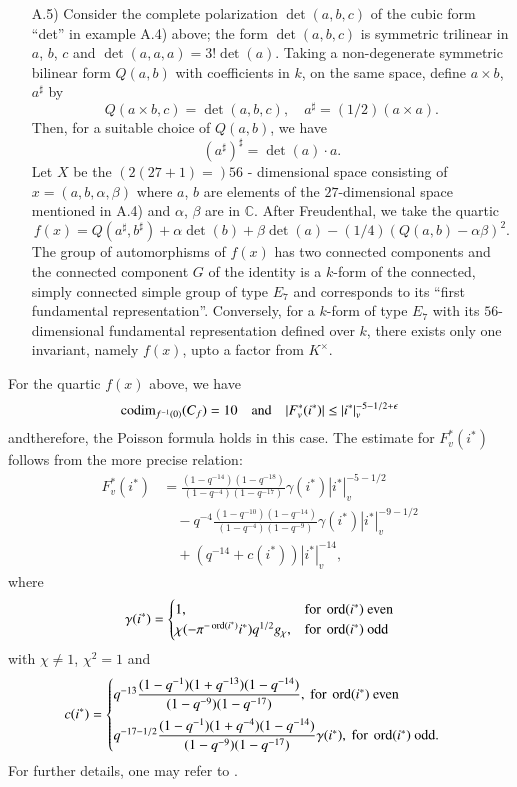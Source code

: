 \begin{itemize}
\item[A.5)] Consider the complete polarization $\det(a,b,c)$ of the
  cubic form ``det'' in example A.4) above; the form $\det(a,b,c)$ is
  symmetric trilinear in $a$, $b$, $c$ and
  $\det(a,a,a)=3!\det(a)$. Taking a non-degenerate symmetric bilinear
  form $Q(a,b)$ with coefficients in $k$, on the same space, define
  $a\times b$, $a^{\sharp}$ by
  $$
  Q(a\times b,c)=\det (a,b,c),\quad a^{\sharp}=(1/2)(a\times a).
  $$
  Then, for a suitable choice of $Q(a,b)$, we have
  $$
  (a^{\sharp})^{\sharp}=\det(a)\cdot a.
  $$
  Let $X$ be the $(2(27+1)=)56$ - dimensional space consisting of
  $x=(a,b,\alpha,\beta)$ where $a$, $b$ are elements of the
  $27$-dimensional space mentioned in A.4) and $\alpha$, $\beta$ are in
  $\mathbb{C}$. After Freudenthal, we take the quartic
  $$
  f(x)=Q(a^{\sharp},b^{\sharp})+\alpha
  \det(b)+\beta\det(a)-(1/4)(Q(a,b)-\alpha\beta)^{2}. 
  $$
  The group of automorphisms of $f(x)$ has two connected components and
  the connected component $G$ of the identity is a $k$-form of the
  connected, simply connected simple group of type $E_{7}$ and
  corresponds to its ``first fundamental representation''. Conversely,
  for a $k$-form of type $E_{7}$ with its $56$-dimensional fundamental
  representation defined over $k$, there exists only one invariant,
  namely $f(x)$, upto a factor from $K^{\times}$.
\end{itemize}

For the quartic $f(x)$ above, we have
$$
\operatorname{codim}_{f^{-1}(0)}(C_{f})=10\quad\text{and}\quad
|F^{\ast}_{v}(i^{\ast})|\leq |i^{\ast}|_{v}^{-5-1/2+\epsilon}
$$
and\pageoriginale therefore, the Poisson formula holds in this
case. The estimate for $F^{\ast}_{v}(i^{\ast})$ follows from the more
precise relation:
\begin{align*}
  F^{\ast}_{v}(i^{\ast}) &=
  \frac{(1-q^{-14})(1-q^{-18})}{(1-q^{-4})(1-q^{-17})}
  \gamma(i^{\ast})|i^{\ast}|^{-5-1/2}_{v}\\[5pt]
  &\quad -q^{-4}\frac{(1-q^{-10})(1-q^{-14})}{(1-q^{-4}) (1-q^{-9})}
  \gamma(i^{\ast})|i^{\ast}|_{v}^{-9-1/2}\\[5pt] 
  &\quad +(q^{-14}+c(i^{\ast}))|i^{\ast}|^{-14}_{v}, 
\end{align*}
where 
$$
\gamma(i^{\ast})=
\begin{cases}
  1, &\text{for } \operatorname{ord}(i^{\ast}) \text{ even}\\
  \chi(-\pi^{-\operatorname{ord}(i^{\ast})}i^{\ast})q^{1/2}g_{\chi}, & \text{for }
  \operatorname{ord}(i^{\ast})\text{ odd} 
\end{cases}
$$
with $\chi\neq 1$, $\chi^{2}=1$ and
$$
c(i^{\ast})=
\begin{cases}
  q^{-13}\dfrac{(1-q^{-1})(1+q^{-13})(1-q^{-14})}{(1-q^{-9})(1-q^{-17})}, 
  \text{ for } \operatorname{ord}(i^{\ast})\text{ even}\\[10pt] 
  q^{-17-1/2}\dfrac{(1-q^{-1})(1+q^{-4})(1-q^{-14})}{(1-q^{-9})(1-q^{-17})}
  \gamma(i^{\ast}), \text{ for } \operatorname{ord}(i^{\ast})\text{ odd.}
\end{cases}
$$
For further details, one may refer to \cite{Igu 9}.

